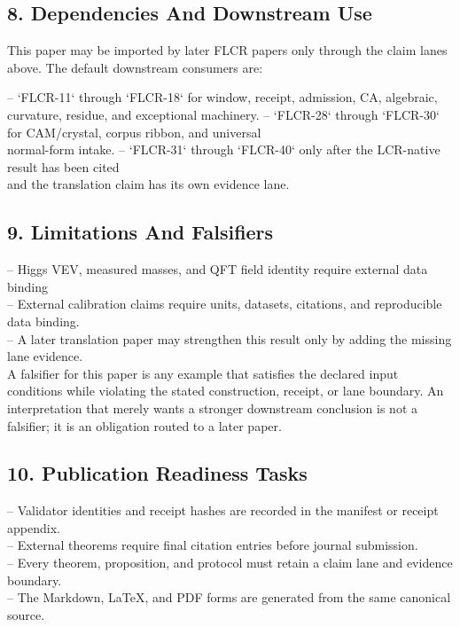\documentclass[11pt]{article}
\begin{document}
\subsection*{8. Dependencies And Downstream Use}

This paper may be imported by later FLCR papers only through the claim lanes
above. The default downstream consumers are:

\noindent{}-- `FLCR-11` through `FLCR-18` for window, receipt, admission, CA, algebraic,\\
  curvature, residue, and exceptional machinery.
\noindent{}-- `FLCR-28` through `FLCR-30` for CAM/crystal, corpus ribbon, and universal\\
  normal-form intake.
\noindent{}-- `FLCR-31` through `FLCR-40` only after the LCR-native result has been cited\\
  and the translation claim has its own evidence lane.

\subsection*{9. Limitations And Falsifiers}

\noindent{}-- Higgs VEV, measured masses, and QFT field identity require external data binding\\
\noindent{}-- External calibration claims require units, datasets, citations, and reproducible data binding.\\
\noindent{}-- A later translation paper may strengthen this result only by adding the missing lane evidence.\\

A falsifier for this paper is any example that satisfies the declared input
conditions while violating the stated construction, receipt, or lane boundary.
An interpretation that merely wants a stronger downstream conclusion is not a
falsifier; it is an obligation routed to a later paper.

\subsection*{10. Publication Readiness Tasks}

\noindent{}-- Validator identities and receipt hashes are recorded in the manifest or receipt appendix.\\
\noindent{}-- External theorems require final citation entries before journal submission.\\
\noindent{}-- Every theorem, proposition, and protocol must retain a claim lane and evidence boundary.\\
\noindent{}-- The Markdown, LaTeX, and PDF forms are generated from the same canonical source.\\
\end{document}

